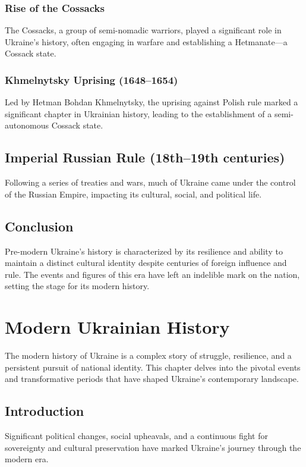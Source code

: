 \documentclass[a4paper,12pt]{book}
\begin{document}
\subsection{Rise of the Cossacks}
The Cossacks, a group of semi-nomadic warriors, played a significant role in Ukraine’s history, often engaging in warfare and establishing a Hetmanate—a Cossack state.

\subsection{Khmelnytsky Uprising (1648–1654)}
Led by Hetman Bohdan Khmelnytsky, the uprising against Polish rule marked a significant chapter in Ukrainian history, leading to the establishment of a semi-autonomous Cossack state.

\section{Imperial Russian Rule (18th–19th centuries)}
\label{sec:imperial-russian-rule}
Following a series of treaties and wars, much of Ukraine came under the control of the Russian Empire, impacting its cultural, social, and political life.

\section{Conclusion}
\label{sec:conclusion-pre-modern-ukraine}
Pre-modern Ukraine’s history is characterized by its resilience and ability to maintain a distinct cultural identity despite centuries of foreign influence and rule. The events and figures of this era have left an indelible mark on the nation, setting the stage for its modern history.

\chapter{Modern Ukrainian History}
\label{ch:modern-ukrainian-history}

The modern history of Ukraine is a complex story of struggle, resilience, and a persistent pursuit of national identity. This chapter delves into the pivotal events and transformative periods that have shaped Ukraine's contemporary landscape.

\section{Introduction}
\label{sec:introduction-modern-ukraine}
Significant political changes, social upheavals, and a continuous fight for sovereignty and cultural preservation have marked Ukraine's journey through the modern era.
\end{document}
